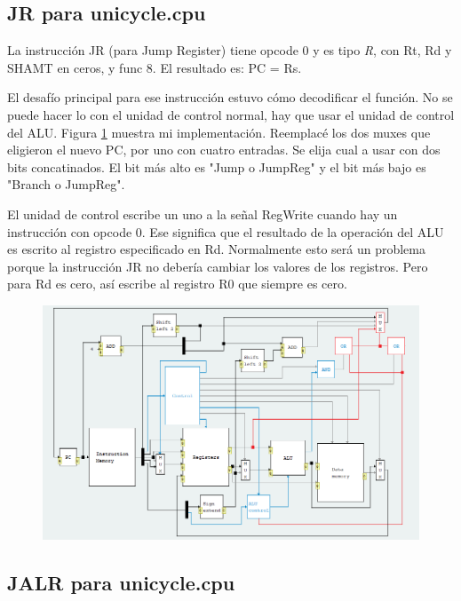 \documentclass[a4paper]{article}
\begin{document}
\subsection{JR para unicycle.cpu}

La instrucción JR (para Jump Register) tiene opcode 0 y es tipo \textit{R}, con Rt, Rd y SHAMT en ceros, y func 8. El resultado es: PC = Rs.

El desafío principal para ese instrucción estuvo cómo decodificar el función. No se puede hacer lo con el unidad de control normal, hay que usar el unidad de control del ALU. Figura \ref{fig:jr_unicycle} muestra mi implementación. Reemplacé los dos muxes que eligieron el nuevo PC, por uno con cuatro entradas. Se elija cual a usar con dos bits concatinados. El bit más alto es "Jump o JumpReg" y el bit más bajo es "Branch o JumpReg".

El unidad de control escribe un uno a la señal RegWrite cuando hay un instrucción con opcode 0. Ese significa que el resultado de la operación del ALU es escrito al registro especificado en Rd. Normalmente esto será un problema porque la instrucción JR no debería cambiar los valores de los registros. Pero para Rd es cero, así escribe al registro R0 que siempre es cero.

\begin{figure}[h]
\centering
\includegraphics[scale=.7]{./img/jr_unicycle.png}
\label{fig:jr_unicycle}
\end{figure}

\subsection{JALR para unicycle.cpu}
\end{document}
